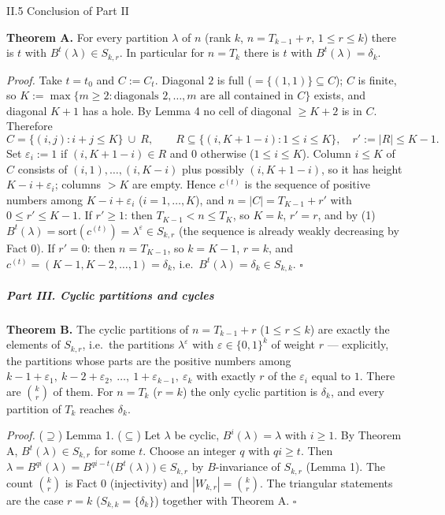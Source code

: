 II.5 Conclusion of Part II

\textbf{Theorem A.} For every partition \(\lambda\) of \(n\) (rank
\(k\), \(n=T_{k-1}+r\), \(1\le r\le k\)) there is \(t\) with
\(B^t(\lambda)\in S_{k,r}\). In particular for \(n=T_k\) there is \(t\)
with \(B^t(\lambda)=\delta_k\).

\emph{Proof.} Take \(t=t_0\) and \(C:=C_{t}\). Diagonal \(2\) is full
(\(=\{(1,1)\}\subseteq C\)); \(C\) is finite, so
\(K:=\max\{m\ge2:\text{diagonals }2,\dots,m\text{ are all contained in }C\}\)
exists, and diagonal \(K+1\) has a hole. By Lemma 4 no cell of diagonal
\(\ge K+2\) is in \(C\). Therefore
\[C=\{(i,j):i+j\le K\}\ \cup\ R,\qquad R\subseteq\{(i,K+1-i):1\le i\le K\},\quad r':=|R|\le K-1.\]
Set \(\varepsilon_i:=1\) if \((i,K+1-i)\in R\) and \(0\) otherwise
(\(1\le i\le K\)). Column \(i\le K\) of \(C\) consists of
\((i,1),\dots,(i,K-i)\) plus possibly \((i,K+1-i)\), so it has height
\(K-i+\varepsilon_i\); columns \(>K\) are empty. Hence \(c^{(t)}\) is
the sequence of positive numbers among \(K-i+\varepsilon_i\)
(\(i=1,\dots,K\)), and \(n=|C|=T_{K-1}+r'\) with \(0\le r'\le K-1\). If
\(r'\ge1\): then \(T_{K-1}<n\le T_K\), so \(K=k\), \(r'=r\), and by (1)
\(B^t(\lambda)=\mathrm{sort}(c^{(t)})=\lambda^\varepsilon\in S_{k,r}\)
(the sequence is already weakly decreasing by Fact 0). If \(r'=0\): then
\(n=T_{K-1}\), so \(k=K-1\), \(r=k\), and
\(c^{(t)}=(K-1,K-2,\dots,1)=\delta_k\),
i.e.~\(B^t(\lambda)=\delta_k\in S_{k,k}\). \(\square\)

\subparagraph{Part III. Cyclic partitions and
cycles}\label{part-iii.-cyclic-partitions-and-cycles}

\textbf{Theorem B.} The cyclic partitions of \(n=T_{k-1}+r\)
(\(1\le r\le k\)) are exactly the elements of \(S_{k,r}\), i.e.~the
partitions \(\lambda^\varepsilon\) with \(\varepsilon\in\{0,1\}^k\) of
weight \(r\) --- explicitly, the partitions whose parts are the positive
numbers among
\(k-1+\varepsilon_1,\ k-2+\varepsilon_2,\ \dots,\ 1+\varepsilon_{k-1},\ \varepsilon_k\)
with exactly \(r\) of the \(\varepsilon_i\) equal to \(1\). There are
\(\binom kr\) of them. For \(n=T_k\) (\(r=k\)) the only cyclic partition
is \(\delta_k\), and every partition of \(T_k\) reaches \(\delta_k\).

\emph{Proof.} (\(\supseteq\)) Lemma 1. (\(\subseteq\)) Let \(\lambda\)
be cyclic, \(B^i(\lambda)=\lambda\) with \(i\ge1\). By Theorem A,
\(B^t(\lambda)\in S_{k,r}\) for some \(t\). Choose an integer \(q\) with
\(qi\ge t\). Then
\(\lambda=B^{qi}(\lambda)=B^{qi-t}\big(B^t(\lambda)\big)\in S_{k,r}\) by
\(B\)-invariance of \(S_{k,r}\) (Lemma 1). The count \(\binom kr\) is
Fact 0 (injectivity) and \(|W_{k,r}|=\binom kr\). The triangular
statements are the case \(r=k\) (\(S_{k,k}=\{\delta_k\}\)) together with
Theorem A. \(\square\)

